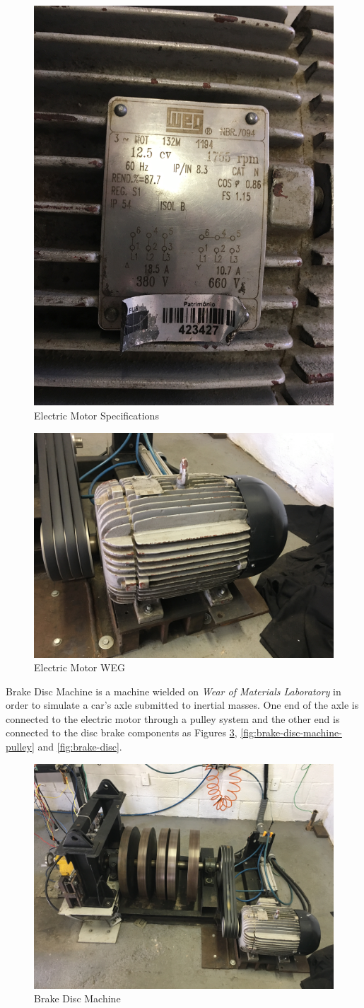 		\begin{figure}[htbp]
			\centering
			\includegraphics[width=.5\textwidth, angle=270]{figuras/fig-electric-motor-specs}
			\caption{Electric Motor Specifications}
			\label{fig:electric-motor-specs}
		\end{figure}

		\begin{figure}[htbp]
			\centering
			\includegraphics[width=.5\textwidth]{figuras/fig-electric-motor}
			\caption{Electric Motor WEG}
			\label{fig:electric-motor}
		\end{figure}
		\par

		Brake Disc Machine is a machine wielded on \textit{Wear of Materials Laboratory} in order to simulate a car's axle submitted to inertial masses. One end of the axle is connected to the electric motor through a pulley system and the other end is connected to the disc brake components as Figures \ref{fig:brake-disc-machine}, \ref{fig:brake-disc-machine-pulley} and \ref{fig:brake-disc}.

		\begin{figure}[htbp]
			\centering
			\includegraphics[width=.5\textwidth]{figuras/fig-brake-disc-machine}
			\caption{Brake Disc Machine}
			\label{fig:brake-disc-machine}
		\end{figure}

